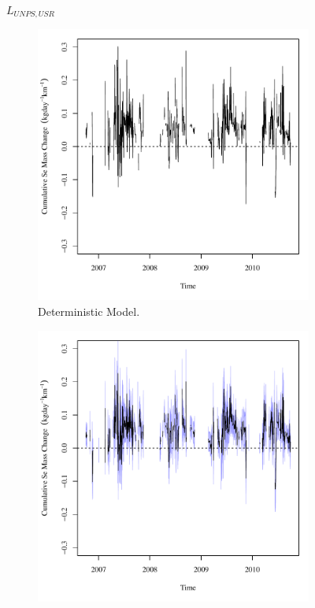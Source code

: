 \begin{linenumbers}
\subfiguretop
\begin{landscape}
	\begin{figure}
		$ \displaystyle L_{UNPS,USR} $
		\begin{subfigure}{0.7\textwidth}
			\centering
			\includegraphics[width=\tableCustomSize]{"Figures/Results_USR/Deterministic/Balance Mass"}
			\caption{Deterministic Model.}
		\end{subfigure}%
		\begin{subfigure}{0.7\textwidth}
			\centering
			\includegraphics[width=\tableCustomSize]{"Figures/Results_USR/Stochastic/Balance Mass"}

\end{subfigure}
\end{figure}
\end{landscape}
\end{linenumbers}
